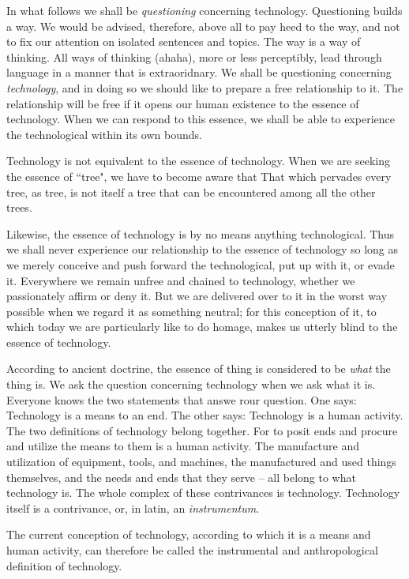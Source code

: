 \documentclass[paper=a4, fontsize=11pt,twoside]{scrartcl}
\begin{document}
\vspace{5.0cm}
In what follows we shall be \textit{questioning} concerning technology. Questioning builds a way. We would be advised, therefore, above all to pay heed to the way, and not to fix our attention on isolated sentences and topics. The way is a way of thinking. All ways of thinking (ahaha), more or less perceptibly, lead through language in a manner that is extraoridnary. We shall be questioning concerning \textit{technology}, and in doing so we should like to prepare a free relationship to it. The relationship will be free if it opens our human existence to the essence of technology. When we can respond to this essence, we shall be able to experience the technological within its own bounds.

Technology is not equivalent to the essence of technology. When we are seeking the essence of ``tree", we have to become aware that That which pervades every tree, as tree, is not itself a tree that can be encountered among all the other trees.

Likewise, the essence of technology is by no means anything technological. Thus we shall never experience our relationship to the essence of technology so long as we merely conceive and push forward the technological, put up with it, or evade it. Everywhere we remain unfree and chained to technology, whether we passionately affirm or deny it. But we are delivered over to it in the worst way possible when we regard it as something neutral; for this conception of it, to which today we are particularly like to do homage, makes us utterly blind to the essence of technology.

According to ancient doctrine, the essence of thing is considered to be \textit{what} the thing is. We ask the question concerning technology when we ask what it is. Everyone knows the two statements that answe rour question. One says: Technology is a means to an end. The other says: Technology is a human activity. The two definitions of technology belong together. For to posit ends and procure and utilize the means to them is a human activity. The manufacture and utilization of equipment, tools, and machines, the manufactured and used things themselves, and the needs and ends that they serve -- all belong to what technology is. The whole complex of these contrivances is technology. Technology itself is a contrivance, or, in latin, an \textit{instrumentum}.

The current conception of technology, according to which it is a means and human activity, can therefore be called the instrumental and anthropological definition of technology.
\end{document}
